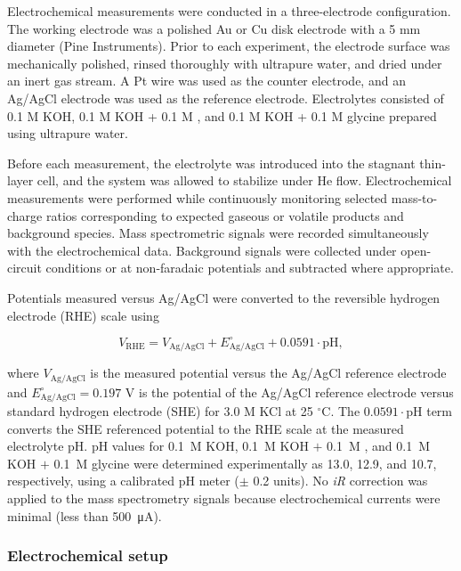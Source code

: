 \documentclass[twoside,twocolumn,9pt]{article}
\begin{document}
Electrochemical measurements were conducted in a three-electrode configuration. The working electrode was a polished Au or Cu disk electrode with a 5 mm diameter (Pine Instruments). Prior to each experiment, the electrode surface was mechanically polished, rinsed thoroughly with ultrapure water, and dried under an inert gas stream. A Pt wire was used as the counter electrode, and an Ag/AgCl electrode was used as the reference electrode. Electrolytes consisted of 0.1 M KOH, 0.1 M KOH + 0.1 M , and 0.1 M KOH + 0.1 M glycine prepared using ultrapure water. 

Before each measurement, the electrolyte was introduced into the stagnant thin-layer cell, and the system was allowed to stabilize under He flow. Electrochemical measurements were performed while continuously monitoring selected mass-to-charge ratios corresponding to expected gaseous or volatile products and background species. Mass spectrometric signals were recorded simultaneously with the electrochemical data. Background signals were collected under open-circuit conditions or at non-faradaic potentials and subtracted where appropriate. 

Potentials measured versus Ag/AgCl were converted to the reversible hydrogen electrode (RHE) scale using

\begin{equation}
V_{\mathrm{RHE}} = V_{\mathrm{Ag/AgCl}} + E_{\mathrm{Ag/AgCl}}^{\circ} + 0.0591 \cdot \mathrm{pH},
\end{equation}

where \(V_{\mathrm{Ag/AgCl}}\) is the measured potential versus the Ag/AgCl reference electrode and \(E_{\mathrm{Ag/AgCl}}^{\circ} = 0.197\) V is the potential of the Ag/AgCl reference electrode versus standard hydrogen electrode (SHE) for 3.0 M KCl at 25 \(^\circ\)C. The \(0.0591 \cdot \mathrm{pH}\) term converts the SHE referenced potential to the RHE scale at the measured electrolyte pH. pH values for \SI{0.1}{M} KOH, \SI{0.1}{M} KOH $+$ \SI{0.1}{M} , and \SI{0.1}{M} KOH $+$ \SI{0.1}{M} glycine were determined experimentally as 13.0, 12.9, and 10.7, respectively, using a calibrated pH meter ($\pm$ 0.2 units). No \textit{iR} correction was applied to the mass spectrometry signals because electrochemical currents were minimal (less than \SI{500}{\micro\ampere}).



\subsubsection{Electrochemical setup}
\end{document}
